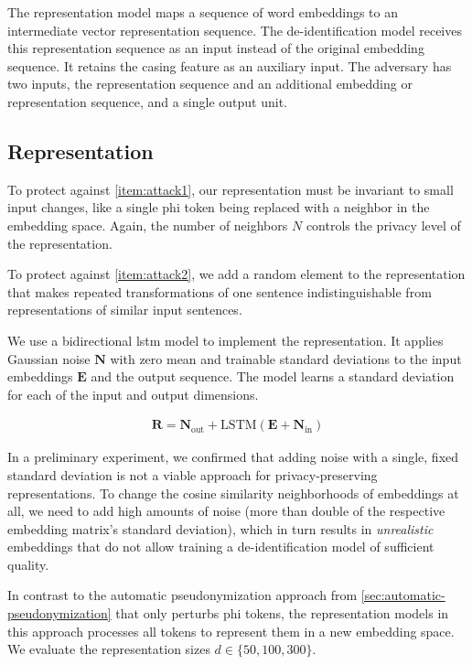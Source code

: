 %
The representation model maps a sequence of word embeddings to an intermediate vector representation sequence.
%
The de-identification model receives this representation sequence as an input instead of the original embedding sequence.
%
It retains the casing feature as an auxiliary input.
%
The adversary has two inputs, the representation sequence and an additional embedding or representation sequence, and a single output unit.

\subsection{Representation}
%
To protect against \ref{item:attack1}, our representation must be invariant to small input changes, like a single \ac{phi} token being replaced with a neighbor in the embedding space.
%
Again, the number of neighbors $N$ controls the privacy level of the representation.

%
To protect against \ref{item:attack2}, we add a random element to the representation that makes repeated transformations of one sentence indistinguishable from representations of similar input sentences.

%
We use a bidirectional \ac{lstm} model to implement the representation.
%
It applies Gaussian noise $\bm{N}$ with zero mean and trainable standard deviations to the input embeddings $\bm{E}$ and the output sequence.
%
The model learns a standard deviation for each of the input and output dimensions.

\begin{align}
\bm{R} = \bm{N}_{\text{out}} + \text{LSTM}(\bm{E} + \bm{N}_{\text{in}})
\end{align}

%
In a preliminary experiment, we confirmed that adding noise with a single, fixed standard deviation is not a viable approach for privacy-preserving representations.
%
To change the cosine similarity neighborhoods of embeddings at all, we need to add high amounts of noise (more than double of the respective embedding matrix's standard deviation), which in turn results in \emph{unrealistic} embeddings that do not allow training a de-identification model of sufficient quality.
%

%
In contrast to the automatic pseudonymization approach from \cref{sec:automatic-pseudonymization} that only perturbs \ac{phi} tokens, the representation models in this approach processes all tokens to represent them in a new embedding space.
%
We evaluate the representation sizes $d \in \{50, 100, 300\}$. 

